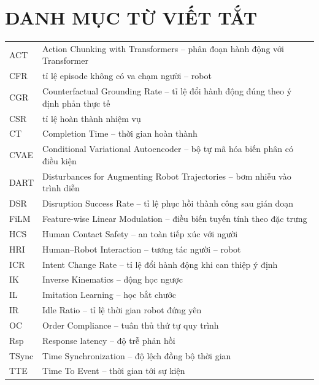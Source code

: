 \chapter*{DANH MỤC TỪ VIẾT TẮT}

\begin{longtable}{@{}p{0.8in}p{4.7in}@{}}
  ACT    & Action Chunking with Transformers -- phân đoạn hành động với Transformer \\[4pt]
  CFR    & tỉ lệ episode không có va chạm người -- robot \\[4pt]
  CGR    & Counterfactual Grounding Rate -- tỉ lệ đổi hành động đúng theo ý định phản thực tế \\[4pt]
  CSR    & tỉ lệ hoàn thành nhiệm vụ \\[4pt]
  CT     & Completion Time -- thời gian hoàn thành \\[4pt]
  CVAE   & Conditional Variational Autoencoder -- bộ tự mã hóa biến phân có điều kiện \\[4pt]
  DART   & Disturbances for Augmenting Robot Trajectories -- bơm nhiễu vào trình diễn \\[4pt]
  DSR    & Disruption Success Rate -- tỉ lệ phục hồi thành công sau gián đoạn \\[4pt]
  FiLM   & Feature-wise Linear Modulation -- điều biến tuyến tính theo đặc trưng \\[4pt]
  HCS    & Human Contact Safety -- an toàn tiếp xúc với người \\[4pt]
  HRI    & Human--Robot Interaction -- tương tác người -- robot \\[4pt]
  ICR    & Intent Change Rate -- tỉ lệ đổi hành động khi can thiệp ý định \\[4pt]
  IK     & Inverse Kinematics -- động học ngược \\[4pt]
  IL     & Imitation Learning -- học bắt chước \\[4pt]
  IR     & Idle Ratio -- tỉ lệ thời gian robot đứng yên \\[4pt]
  OC     & Order Compliance -- tuân thủ thứ tự quy trình \\[4pt]
  Rsp    & Response latency -- độ trễ phản hồi \\[4pt]
  TSync  & Time Synchronization -- độ lệch đồng bộ thời gian \\[4pt]
  TTE    & Time To Event -- thời gian tới sự kiện \\
\end{longtable}
